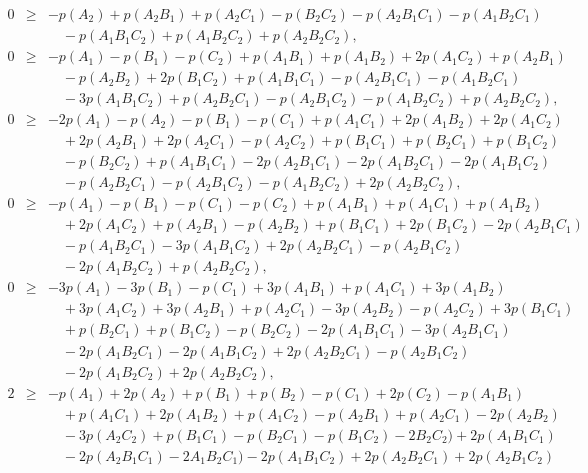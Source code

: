 \begin{eqnarray}
0&\ge& -p(A_2)+p(A_2B_1)+p(A_2C_1)-p(B_2C_2)-p(A_2B_1C_1)-p(A_1B_2C_1)
\nonumber\\&&\quad
-p(A_1B_1C_2)+p(A_1B_2C_2)+p(A_2B_2C_2)
\label{eghz-0}
,\\
0&\ge& -p(A_1)-p(B_1)-p(C_2)+p(A_1B_1)+p(A_1B_2)+2p(A_1C_2)+p(A_2B_1)
\nonumber\\&&\quad
-p(A_2B_2)+2p(B_1C_2)+p(A_1B_1C_1)-p(A_2B_1C_1)-p(A_1B_2C_1)
\nonumber\\&&\quad
-3p(A_1B_1C_2)+p(A_2B_2C_1)-p(A_2B_1C_2)-p(A_1B_2C_2)+p(A_2B_2C_2)
\label{eghz-1}
,\\
0&\ge& -2p(A_1)-p(A_2)-p(B_1)-p(C_1)+p(A_1C_1)+2p(A_1B_2)+2p(A_1C_2)
\nonumber\\&&\quad
+2p(A_2B_1)+2p(A_2C_1)-p(A_2C_2)+p(B_1C_1)+p(B_2C_1)+p(B_1C_2)
\nonumber\\&&\quad
-p(B_2C_2)   +p(A_1B_1C_1)-2p(A_2B_1C_1)-2p(A_1B_2C_1)-2p(A_1B_1C_2)
\nonumber\\&&\quad
-p(A_2B_2C_1)   -p(A_2B_1C_2)-p(A_1B_2C_2)+2p(A_2B_2C_2)
\label{eghz-2}
,\\
0&\ge& -p(A_1)-p(B_1)-p(C_1)-p(C_2)+p(A_1B_1)+p(A_1C_1)+p(A_1B_2)
\nonumber\\&&\quad
+2p(A_1C_2)+p(A_2B_1)-p(A_2B_2)+p(B_1C_1)+2p(B_1C_2)-2p(A_2B_1C_1)
\nonumber\\&&\quad
-p(A_1B_2C_1)-3p(A_1B_1C_2)+2p(A_2B_2C_1)-p(A_2B_1C_2)
\nonumber\\&&\quad
-2p(A_1B_2C_2)+p(A_2B_2C_2)
\label{eghz-3}
,\\
0&\ge& -3p(A_1)-3p(B_1)-p(C_1)+3p(A_1B_1)+p(A_1C_1)+3p(A_1B_2)
\nonumber\\&&\quad
+3p(A_1C_2)+3p(A_2B_1)+p(A_2C_1)-3p(A_2B_2)-p(A_2C_2)+3p(B_1C_1)
\nonumber\\&&\quad
+p(B_2C_1)+p(B_1C_2)-p(B_2C_2)-2p(A_1B_1C_1)-3p(A_2B_1C_1)
\nonumber\\&&\quad
-2p(A_1B_2C_1) -2p(A_1B_1C_2)+2p(A_2B_2C_1)-p(A_2B_1C_2)
\nonumber\\&&\quad
-2p(A_1B_2C_2)+2p(A_2B_2C_2)
\label{eghz-4}
,\\
2&\ge& -p(A_1)+2p(A_2)+p(B_1)+p(B_2)-p(C_1)+2p(C_2)-p(A_1B_1)
\nonumber\\&&\quad
+p(A_1C_1)+2p(A_1B_2)+p(A_1C_2)-p(A_2B_1)+p(A_2C_1)-2p(A_2B_2)
\nonumber\\&&\quad
-3p(A_2C_2)+p(B_1C_1)- p(B_2C_1)- p(B_1C_2)-2B_2C_2)+2p(A_1B_1C_1)
\nonumber\\&&\quad
-2p(A_2B_1C_1)-2A_1B_2C_1)-2p(A_1B_1C_2)+2p(A_2B_2C_1)+2p(A_2B_1C_2)

\end{eqnarray}
